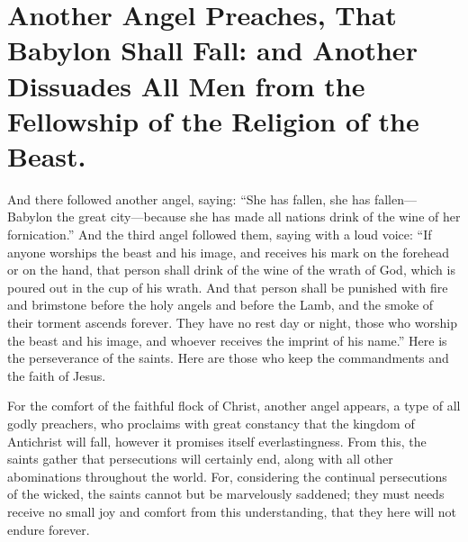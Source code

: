 \chapter[Sermon 64. Another Angel Preaches, That Babylon Shall Fall: and Another Dissuades All Men from the Fellowship of the Religion of the Beast.]{Another Angel Preaches, That Babylon Shall Fall: and Another Dissuades All Men from the Fellowship of the Religion of the Beast.}
\label{sermon:064}

And there followed another angel, saying: “She has fallen, she has fallen—Babylon the great city—because she has made all nations drink of the wine of her fornication.” And the third angel followed them, saying with a loud voice: “If anyone worships the beast and his image, and receives his mark on the forehead or on the hand, that person shall drink of the wine of the wrath of God, which is poured out in the cup of his wrath. And that person shall be punished with fire and brimstone before the holy angels and before the Lamb, and the smoke of their torment ascends forever. They have no rest day or night, those who worship the beast and his image, and whoever receives the imprint of his name.” Here is the perseverance of the saints. Here are those who keep the commandments and the faith of Jesus.

For the comfort of the faithful flock of Christ, another angel appears, a type of all godly preachers, who proclaims with great constancy that the kingdom of Antichrist will fall, however it promises itself everlastingness. From this, the saints gather that persecutions will certainly end, along with all other abominations throughout the world. For, considering the continual persecutions of the wicked, the saints cannot but be marvelously saddened; they must needs receive no small joy and comfort from this understanding, that they here will not endure forever.

